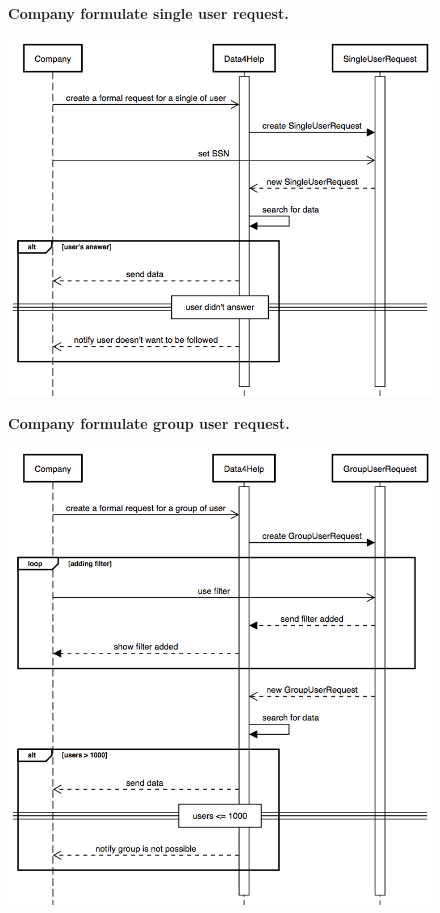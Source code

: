 \documentclass{article}
\begin{document}
\begin{figure}[h!]
\centering
    \textbf{Company formulate single user request.}\par\medskip
	\includegraphics[width= \linewidth]{singlerequest.png}
\end{figure}\newpage
\begin{figure}[h!]
\centering
    \textbf{Company formulate group user request.}\par\medskip
	\includegraphics[width= \linewidth]{grouprequest.png}
\end{figure}\newpage
\end{document}
